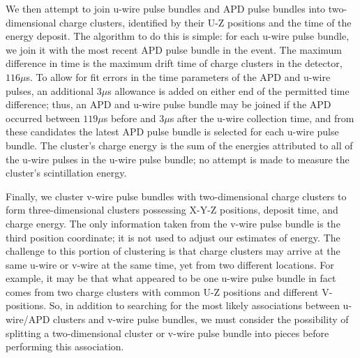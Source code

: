 We then attempt to join u-wire pulse bundles and APD pulse bundles into two-dimensional charge clusters, identified by their U-Z positions and the time of the energy deposit.  The algorithm to do this is simple: for each u-wire pulse bundle, we join it with the most recent APD pulse bundle in the event.  The maximum difference in time is the maximum drift time of charge clusters in the detector, $116 \mu$s.  To allow for fit errors in the time parameters of the APD and u-wire pulses, an additional $3 \mu$s allowance is added on either end of the permitted time difference; thus, an APD and u-wire pulse bundle may be joined if the APD occurred between $119 \mu$s before and $3 \mu$s after the u-wire collection time, and from these candidates the latest APD pulse bundle is selected for each u-wire pulse bundle.  The cluster's charge energy is the sum of the energies attributed to all of the u-wire pulses in the u-wire pulse bundle; no attempt is made to measure the cluster's scintillation energy.

Finally, we cluster v-wire pulse bundles with two-dimensional charge clusters to form three-dimensional clusters possessing X-Y-Z positions, deposit time, and charge energy.  The only information taken from the v-wire pulse bundle is the third position coordinate; it is not used to adjust our estimates of energy.  The challenge to this portion of clustering is that charge clusters may arrive at the same u-wire or v-wire at the same time, yet from two different locations.  For example, it may be that what appeared to be one u-wire pulse bundle in fact comes from two charge clusters with common U-Z positions and different V-positions.  So, in addition to searching for the most likely associations between u-wire/APD clusters and v-wire pulse bundles, we must consider the possibility of splitting a two-dimensional cluster or v-wire pulse bundle into pieces before performing this association.

